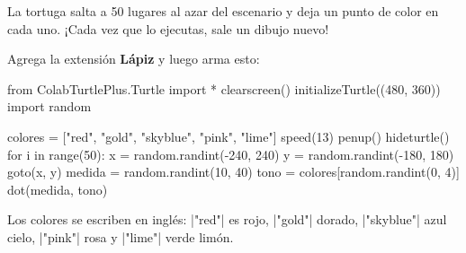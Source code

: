 
La tortuga salta a 50 lugares al azar del escenario y deja un punto de color en cada uno. ¡Cada vez que lo ejecutas, sale un dibujo nuevo!

Agrega la extensión \textbf{Lápiz} y luego arma esto:

\begin{center}
\begin{scratch}
\end{scratch}
\end{center}


\begin{typethis}
from ColabTurtlePlus.Turtle import *
clearscreen()
initializeTurtle((480, 360))
import random

colores = ["red", "gold", "skyblue", "pink", "lime"]
speed(13)
penup()
hideturtle()
for i in range(50):
    x = random.randint(-240, 240)
    y = random.randint(-180, 180)
    goto(x, y)
    medida = random.randint(10, 40)
    tono = colores[random.randint(0, 4)]
    dot(medida, tono)
\end{typethis}

Los colores se escriben en inglés: \py|"red"| es rojo, \py|"gold"| dorado, \py|"skyblue"| azul cielo, \py|"pink"| rosa y \py|"lime"| verde limón.


